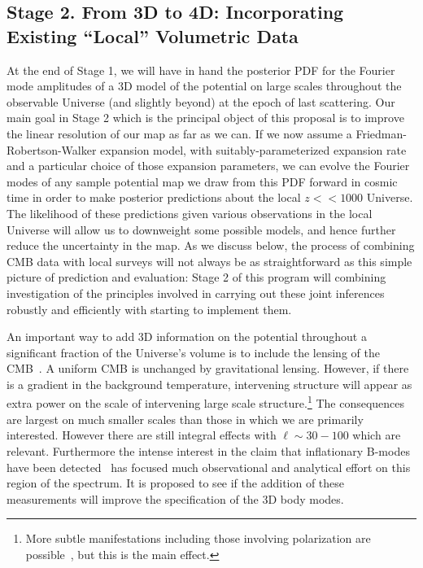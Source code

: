 \documentclass[psfig,12pt]{article}
\def\ni{\noindent}
\begin{document}
{%

\subsection{Stage 2. From 3D to 4D: Incorporating Existing ``Local'' Volumetric Data}

At the end of Stage 1, we will have in hand the posterior PDF for the
Fourier mode amplitudes of a 3D model of the potential on large scales
throughout the observable Universe (and slightly beyond) at the epoch of
last scattering.
Our main goal in Stage 2 which is the principal object of this proposal
is to improve the linear resolution of our map as far as we can.
If we now assume a  Friedman-Robertson-Walker expansion
model, with suitably-parameterized expansion rate and a particular
choice of those expansion parameters,  we can evolve the Fourier modes
of any sample potential map we draw  from this PDF forward in cosmic
time in order to make posterior  predictions about the local
$z << 1000$ Universe. The likelihood of these predictions given various
observations in the local Universe will allow us to downweight some
possible models, and hence further reduce the uncertainty in the map.
As we discuss below, the process of combining CMB data with local surveys
will not always be as straightforward as this simple picture of
prediction and evaluation: Stage 2 of this program will combining
investigation of the principles involved in carrying out these joint inferences robustly and
efficiently with starting to implement them.

\ni{\bf CMB Lensing and ISW Measurements:}
An important way to add 3D information on the potential throughout a
significant fraction of the Universe's volume is to include the lensing
of the CMB~\cite{Planck2015cosmopara}. A uniform CMB is unchanged by
gravitational lensing. However, if there is a gradient in the background
temperature, intervening structure will appear as extra power on the
scale of intervening large scale structure.\footnote{More subtle
manifestations including those involving polarization are
possible~\cite{Hu:2002}, but this is the main effect.} The consequences
are largest on much smaller scales than those in which we are primarily
interested. However there are still integral effects with
$\ell\sim30-100$ which are relevant. Furthermore the intense interest in
the claim that inflationary B-modes have been
detected~\cite{Planck2015cosmopara}  has focused much observational and
analytical effort on this region of the spectrum. It is proposed to see
if the addition of these measurements will improve the specification of
the 3D body modes.

}
\end{document}
